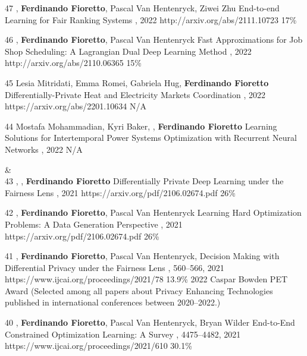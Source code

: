\begin{pubs}
	\confentry
	{47} %
	{, {\bf Ferdinando Fioretto}, Pascal Van Hentenryck, Ziwei Zhu}
	{End-to-end Learning for Fair Ranking Systems}
	{\procWWW, 2022}
	{http://arxiv.org/abs/2111.10723}	
	{17\%}
	
	\confentry
	{46} %
	{, {\bf Ferdinando Fioretto}, Pascal Van Hentenryck}
	{Fast Approximations for Job Shop Scheduling: A Lagrangian Dual Deep Learning Method}
	{\procAAAI, 2022}
	{http://arxiv.org/abs/2110.06365}
	{15\%}

	\confentry
	{45} %
	{Lesia Mitridati, Emma Romei, Gabriela Hug, {\bf Ferdinando Fioretto}}
	{Differentially-Private Heat and Electricity Markets Coordination}
	{\procPMAPS, 2022}
	{https://arxiv.org/abs/2201.10634}
	{N/A}
 
	\confentry
	{44} %
	{Mostafa Mohammadian, Kyri Baker, , {\bf Ferdinando Fioretto}}
	{Learning Solutions for Intertemporal Power Systems Optimization with Recurrent Neural Networks}
	{\procPMAPS, 2022}
	{N/A}


{}&\nemph{\rule{0.5\linewidth}{0.5pt}}\\[1em]

	\confentry 
	{43} %
	{, , {\bf Ferdinando Fioretto}}
	{Differentially Private Deep Learning under the Fairness Lens}
	{\procNeurIPS, 2021}
	{https://arxiv.org/pdf/2106.02674.pdf}
	{26\%} %

	\confentry 
	{42} %
	{, {\bf Ferdinando Fioretto}, Pascal Van Hentenryck}
	{Learning Hard Optimization Problems: A Data Generation Perspective}
	{\procNeurIPS, 2021}
	{https://arxiv.org/pdf/2106.02674.pdf}
	{26\%} %

	\confentryAwd 
	{41} %
	{, {\bf Ferdinando Fioretto}, Pascal Van Hentenryck, }
	{Decision Making with Differential Privacy under the Fairness Lens}
	{\procIJCAI, 560--566, 2021}
	{https://www.ijcai.org/proceedings/2021/78}
	{13.9\%} %
	{2022 Caspar Bowden PET Award}
	{(Selected among all papers about Privacy Enhancing Technologies published in international conferences between 2020--2022.)}

	\confentry 
	{40} %
	{, {\bf Ferdinando Fioretto}, Pascal Van Hentenryck, Bryan Wilder}
	{End-to-End Constrained Optimization Learning: A Survey}
	{\procIJCAI, 4475--4482, 2021}
	{https://www.ijcai.org/proceedings/2021/610}
	{30.1\%}


\end{pubs}
